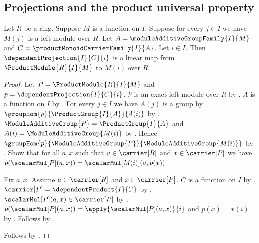\subsection{Projections and the product universal property}

\begin{theorem}\label{product_module_projection_linear}
    Let $R$ be a ring.
    Suppose $M$ is a function on $I$.
    Suppose for every $j\in I$ we have $M(j)$ is a left module over $R$.
    Let $A=\moduleAdditiveGroupFamily{I}{M}$ and
        $C=\productMonoidCarrierFamily{I}{A}$.
    Let $i\in I$.
    Then $\dependentProjection{I}{C}{i}$ is a linear map from
        $\ProductModule{R}{I}{M}$ to $M(i)$ over $R$.
\end{theorem}
\begin{proof}
    Let $P=\ProductModule{R}{I}{M}$ and
        $p=\dependentProjection{I}{C}{i}$.
    $P$ is an exact left module over $R$ by
        .
    $A$ is a function on $I$ by
        .
    For every $j\in I$ we have $A(j)$ is a group by
        .
    $\groupHom{p}{\ProductGroup{I}{A}}{A(i)}$ by
        .
    $\ModuleAdditiveGroup{P}=\ProductGroup{I}{A}$ and
        $A(i)=\ModuleAdditiveGroup{M(i)}$ by
        .
    Hence $\groupHom{p}{\ModuleAdditiveGroup{P}}{
        \ModuleAdditiveGroup{M(i)}}$ by \auto.
    Show that for all $a,x$ such that $a\in\carrier[R]$ and
        $x\in\carrier[P]$ we have
        $p(\scalarMul[P](a,x))=\scalarMul[M(i)](a,p(x))$.
    \begin{subproof}
        Fix $a,x$.
        Assume $a\in\carrier[R]$ and $x\in\carrier[P]$.
        $C$ is a function on $I$ by
            .
        $\carrier[P]=\dependentProduct{I}{C}$ by
            .
        $\scalarMul[P](a,x)\in\carrier[P]$ by
            .
        $p(\scalarMul[P](a,x))
            =\apply{\scalarMul[P](a,x)}{i}$ and $p(x)=x(i)$ by
            .
        Follows by .
    \end{subproof}
    Follows by .
\end{proof}

